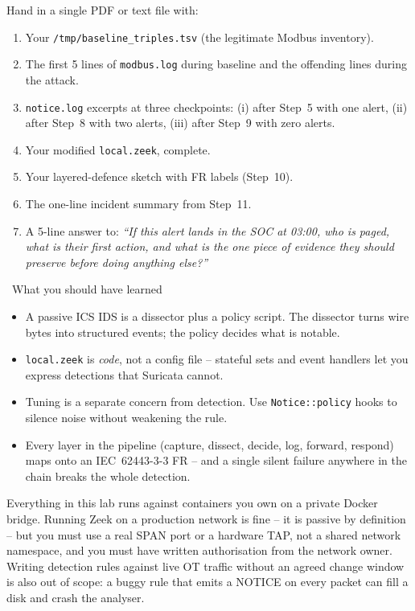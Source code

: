 \documentclass[11pt,a4paper]{article}
\begin{document}
\begin{deliverbox}
Hand in a single PDF or text file with:
\begin{enumerate}\setlength{\itemsep}{1pt}
  \item Your \texttt{/tmp/baseline\_triples.tsv} (the legitimate Modbus inventory).
  \item The first 5 lines of \texttt{modbus.log} during baseline and the offending lines during the attack.
  \item \texttt{notice.log} excerpts at three checkpoints: (i) after Step~5 with one alert, (ii) after Step~8 with two alerts, (iii) after Step~9 with zero alerts.
  \item Your modified \texttt{local.zeek}, complete.
  \item Your layered-defence sketch with FR labels (Step~10).
  \item The one-line incident summary from Step~11.
  \item A 5-line answer to: \emph{``If this alert lands in the SOC at 03:00, who is paged, what is their first action, and what is the one piece of evidence they should preserve before doing anything else?''}
\end{enumerate}
\end{deliverbox}

\begin{notebox}{\faLightbulb\ What you should have learned}
\begin{itemize}\setlength{\itemsep}{1pt}
  \item A passive ICS IDS is a dissector plus a policy script. The dissector turns wire bytes into structured events; the policy decides what is notable.
  \item \texttt{local.zeek} is \emph{code}, not a config file -- stateful sets and event handlers let you express detections that Suricata cannot.
  \item Tuning is a separate concern from detection. Use \texttt{Notice::policy} hooks to silence noise without weakening the rule.
  \item Every layer in the pipeline (capture, dissect, decide, log, forward, respond) maps onto an IEC~62443-3-3 FR -- and a single silent failure anywhere in the chain breaks the whole detection.
\end{itemize}
\end{notebox}

\begin{warnbox}
Everything in this lab runs against containers you own on a private Docker bridge. Running Zeek on a production network is fine -- it is passive by definition -- but you must use a real SPAN port or a hardware TAP, not a shared network namespace, and you must have written authorisation from the network owner. Writing detection rules against live OT traffic without an agreed change window is also out of scope: a buggy rule that emits a NOTICE on every packet can fill a disk and crash the analyser.
\end{warnbox}
\end{document}
